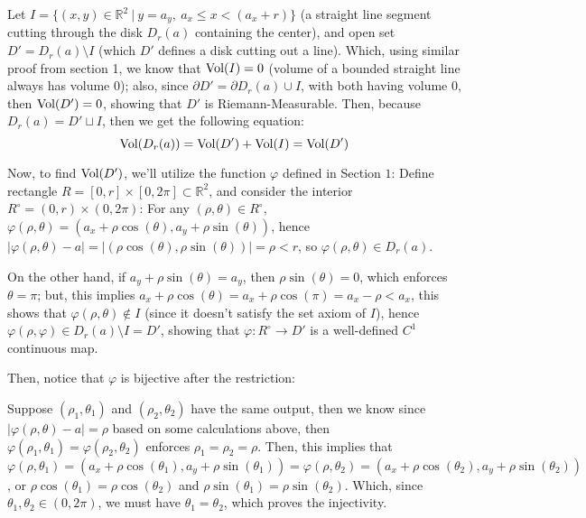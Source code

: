\documentclass{article}
\begin{document}
Let $I=\{(x,y)\in\mathbb{R}^2\ |\ y=a_y,\ a_x\leq x < (a_x+r)\}$ (a straight line segment cutting through the disk $D_r(a)$ containing the center), and open set $D' = D_r(a)\setminus I$ (which $D'$ defines a disk cutting out a line). Which, using similar proof from section 1, we know that $\textmd{Vol}(I) = 0$ (volume of a bounded straight line always has volume $0$); also, since $\partial D' = \partial D_r(a)\cup I$, with both having volume $0$, then $\textmd{Vol}(D') = 0$, showing that $D'$ is Riemann-Measurable.
Then, because $D_r(a)= D' \sqcup I$, then we get the following equation: 
\begin{equation}
    \textmd{Vol}(D_r(a))=\textmd{Vol}(D') + \textmd{Vol}(I) = \textmd{Vol}(D')
\end{equation}

\hfil

Now, to find $\textmd{Vol}(D')$, we'll utilize the function $\varphi$ defined in Section $1$: Define rectangle $R=[0,r]\times [0,2\pi]\subset\mathbb{R}^2$, and consider the interior $R^\circ = (0,r)\times (0,2\pi)$: For any $(\rho,\theta)\in R^\circ$, $\varphi(\rho,\theta)=(a_x+\rho\cos(\theta),a_y+\rho\sin(\theta))$, hence $|\varphi(\rho,\theta)-a| = |(\rho\cos(\theta),\rho\sin(\theta))| = \rho <r$, so $\varphi(\rho,\theta)\in D_r(a)$.

On the other hand, if $a_y+\rho\sin(\theta) = a_y$, then $\rho\sin(\theta) = 0$, which enforces $\theta = \pi$; but, this implies $a_x+\rho\cos(\theta) = a_x+\rho\cos(\pi) = a_x-\rho<a_x$, this shows that $\varphi(\rho,\theta)\notin I$ (since it doesn't satisfy the set axiom of $I$), hence $\varphi(\rho,\varphi)\in D_r(a)\setminus I = D'$, showing that $\varphi:R^\circ\rightarrow D'$ is a well-defined $C^1$ continuous map.

\hfil

Then, notice that $\varphi$ is bijective after the restriction: 

Suppose $(\rho_1,\theta_1)$ and $(\rho_2,\theta_2)$ have the same output, then we know since $|\varphi(\rho,\theta)-a| = \rho$ based on some calculations above, then $\varphi(\rho_1,\theta_1)=\varphi(\rho_2,\theta_2)$ enforces $\rho_1 = \rho_2 = \rho$. Then, this implies that $\varphi(\rho,\theta_1) = (a_x+\rho\cos(\theta_1),a_y+\rho\sin(\theta_1))=\varphi(\rho,\theta_2)=(a_x+\rho\cos(\theta_2),a_y+\rho\sin(\theta_2))$, or $\rho\cos(\theta_1)=\rho\cos(\theta_2)$ and $\rho\sin(\theta_1)=\rho\sin(\theta_2)$. Which, since $\theta_1,\theta_2\in (0,2\pi)$, we must have $\theta_1=\theta_2$, which proves the injectivity.
\end{document}
